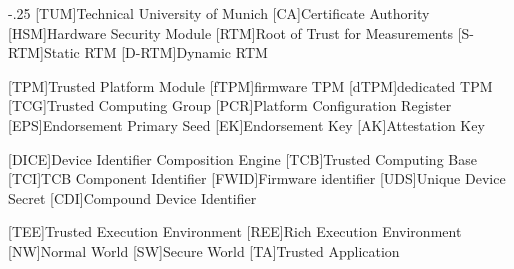 \documentclass[headsepline,footsepline,footinclude=false,fontsize=11pt,paper=a4,listof=totoc,bibliography=totoc,BCOR=12mm,DIV=12]{scrbook} %
\begin{document}


\frontmatter{}





\tableofcontents{}

\mainmatter{}

%








\appendix{}


\begin{acronym}
	\itemsep-.25\baselineskip
	[TUM]{Technical University of Munich}
	[CA]{Certificate Authority}
	[HSM]{Hardware Security Module}
	[RTM]{Root of Trust for Measurements}
	[S-RTM]{Static \ac{RTM}}
	[D-RTM]{Dynamic \ac{RTM}}

	[TPM]{Trusted Platform Module}
	[fTPM]{firmware TPM}
	[dTPM]{dedicated TPM}
	[TCG]{Trusted Computing Group}
	[PCR]{Platform Configuration Register}
	[EPS]{Endorsement Primary Seed}
	[EK]{Endorsement Key}
	[AK]{Attestation Key}

	[DICE]{Device Identifier Composition Engine}
	[TCB]{Trusted Computing Base}
	[TCI]{TCB Component Identifier}
	[FWID]{Firmware identifier}
	[UDS]{Unique Device Secret}
	[CDI]{Compound Device Identifier}

	[TEE]{Trusted Execution Environment}
	[REE]{Rich Execution Environment}
	[NW]{Normal World}
	[SW]{Secure World}
	[TA]{Trusted Application}
\end{acronym}

\listoffigures{}
\listoftables{}
\printbibliography{}
\end{document}
